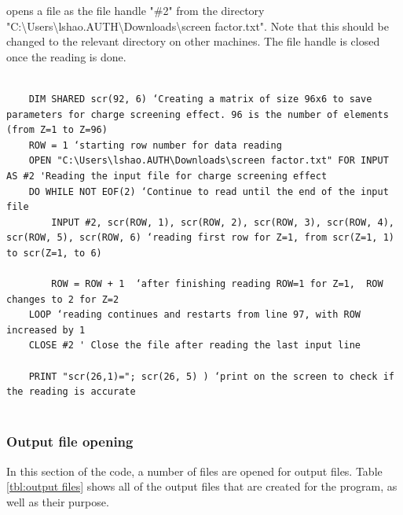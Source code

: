 \documentclass[10pt, reqno]{exam}
\begin{document}
{opens a file as the file handle "\#2" from the directory "C:\textbackslash Users\textbackslash lshao.AUTH\textbackslash Downloads\textbackslash screen factor.txt". Note that this should be changed to the relevant directory on other machines. The file handle is closed once the reading is done.

\begin{verbatim}

    DIM SHARED scr(92, 6) ‘Creating a matrix of size 96x6 to save parameters for charge screening effect. 96 is the number of elements (from Z=1 to Z=96)
    ROW = 1 ‘starting row number for data reading
    OPEN "C:\Users\lshao.AUTH\Downloads\screen factor.txt" FOR INPUT AS #2 'Reading the input file for charge screening effect
    DO WHILE NOT EOF(2) ‘Continue to read until the end of the input file
        INPUT #2, scr(ROW, 1), scr(ROW, 2), scr(ROW, 3), scr(ROW, 4), scr(ROW, 5), scr(ROW, 6) ‘reading first row for Z=1, from scr(Z=1, 1) to scr(Z=1, to 6)
    
        ROW = ROW + 1  ‘after finishing reading ROW=1 for Z=1,  ROW changes to 2 for Z=2
    LOOP ‘reading continues and restarts from line 97, with ROW increased by 1
    CLOSE #2 ' Close the file after reading the last input line
    
    PRINT "scr(26,1)="; scr(26, 5) ) ‘print on the screen to check if the reading is accurate
    
\end{verbatim}
\subsubsection{Output file opening}

In this section of the code, a number of files are opened for output files. Table \ref{tbl:output files} shows all of the output files that are created for the program, as well as their purpose.

}
\end{document}
